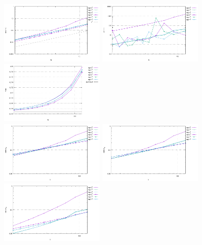 \begin{center}
\includegraphics[width=5cm]{python_codes/fieldstone_75/results/burst/errors_v.pdf}
\includegraphics[width=5cm]{python_codes/fieldstone_75/results/burst/errors_p.pdf}
\includegraphics[width=5cm]{python_codes/fieldstone_75/results/burst/vrms.pdf}\\
\includegraphics[width=5cm]{python_codes/fieldstone_75/results/burst/errors_exx}
\includegraphics[width=5cm]{python_codes/fieldstone_75/results/burst/errors_eyy}
\includegraphics[width=5cm]{python_codes/fieldstone_75/results/burst/errors_ezz}\\

\end{center}
